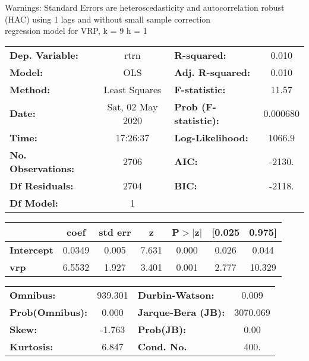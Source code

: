 Warnings: \newline
 [1] Standard Errors are heteroscedasticity and autocorrelation robust (HAC) using 1 lags and without small sample correction\\ 

regression model for VRP, k = 9 h = 1\begin{center}
\begin{tabular}{lclc}
\toprule
\textbf{Dep. Variable:}    &       rtrn       & \textbf{  R-squared:         } &     0.010   \\
\textbf{Model:}            &       OLS        & \textbf{  Adj. R-squared:    } &     0.010   \\
\textbf{Method:}           &  Least Squares   & \textbf{  F-statistic:       } &     11.57   \\
\textbf{Date:}             & Sat, 02 May 2020 & \textbf{  Prob (F-statistic):} &  0.000680   \\
\textbf{Time:}             &     17:26:37     & \textbf{  Log-Likelihood:    } &    1066.9   \\
\textbf{No. Observations:} &        2706      & \textbf{  AIC:               } &    -2130.   \\
\textbf{Df Residuals:}     &        2704      & \textbf{  BIC:               } &    -2118.   \\
\textbf{Df Model:}         &           1      & \textbf{                     } &             \\
\bottomrule
\end{tabular}
\begin{tabular}{lcccccc}
                   & \textbf{coef} & \textbf{std err} & \textbf{z} & \textbf{P$> |$z$|$} & \textbf{[0.025} & \textbf{0.975]}  \\
\midrule
\textbf{Intercept} &       0.0349  &        0.005     &     7.631  &         0.000        &        0.026    &        0.044     \\
\textbf{vrp}       &       6.5532  &        1.927     &     3.401  &         0.001        &        2.777    &       10.329     \\
\bottomrule
\end{tabular}
\begin{tabular}{lclc}
\textbf{Omnibus:}       & 939.301 & \textbf{  Durbin-Watson:     } &    0.009  \\
\textbf{Prob(Omnibus):} &   0.000 & \textbf{  Jarque-Bera (JB):  } & 3070.069  \\
\textbf{Skew:}          &  -1.763 & \textbf{  Prob(JB):          } &     0.00  \\
\textbf{Kurtosis:}      &   6.847 & \textbf{  Cond. No.          } &     400.  \\
\bottomrule
\end{tabular}
\end{center}

